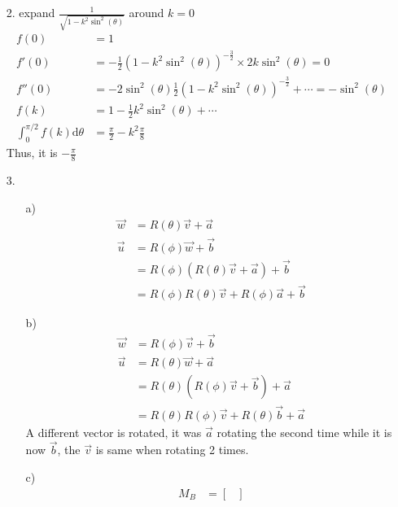 \documentclass{article}
\begin{document}
\begin{itemize}
\begin{itemize}
    
    \end{itemize}
    \item [2.] expand \(\frac{1}{\sqrt{1-k^2\sin^2(\theta)}}\) around \(k=0\)
    \begin{align*}
        f(0) &= 1\\
        f'(0)&= -\frac{1}{2}(1-k^2\sin^2(\theta))^{-\frac{3}{2}}\times 2k\sin^2(\theta) = 0\\
        f''(0)&=-2\sin^2(\theta)\frac{1}{2}(1-k^2\sin^2(\theta))^{-\frac{3}{2}}+\cdots = -\sin^2(\theta)\\
        f(k) &= 1-\frac{1}{2}k^2\sin^2(\theta)+\cdots\\
        \int_{0}^{\pi/2}f(k)\text{d}{\theta} &= \frac{\pi}{2}-k^2\frac{\pi}{8}
    \end{align*}
    Thus, it is \(-\frac{\pi}{8}\)
    \item [3.]
    \begin{itemize}
        \item [a)]
        \begin{align*}
            \overrightarrow{w}&=R(\theta)\overrightarrow{v}+\overrightarrow{a}\\
            \overrightarrow{u}&=R(\phi)\overrightarrow{w}+\overrightarrow{b}\\
            &=R(\phi)(R(\theta)\overrightarrow{v}+\overrightarrow{a})+\overrightarrow{b}\\
            &=R(\phi)R(\theta)\overrightarrow{v}+R(\phi)\overrightarrow{a}+\overrightarrow{b}
        \end{align*}
        \item [b)]
        \begin{align*}
            \overrightarrow{w}&=R(\phi)\overrightarrow{v}+\overrightarrow{b}\\
            \overrightarrow{u}&=R(\theta)\overrightarrow{w}+\overrightarrow{a}\\
            &=R(\theta)(R(\phi)\overrightarrow{v}+\overrightarrow{b})+\overrightarrow{a}\\
            &=R(\theta)R(\phi)\overrightarrow{v}+R(\theta)\overrightarrow{b}+\overrightarrow{a}
        \end{align*}
        A different vector is rotated, it was \(\overrightarrow{a}\) rotating the second time while it is now \(\overrightarrow{b}\), the \(\overrightarrow{v}\) is same when rotating 2 times.
        \item [c)]
        \begin{align*}
            M_B &= \begin{bmatrix}

\end{bmatrix}
\end{align*}
\end{itemize}
\end{itemize}
\end{document}
